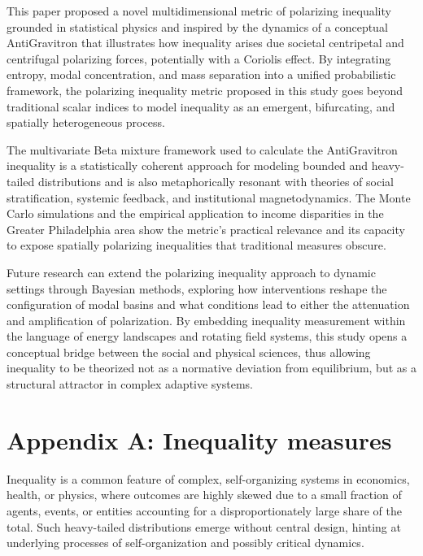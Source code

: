 \documentclass[11pt]{article}
\begin{document}
This paper proposed a novel multidimensional metric of polarizing inequality grounded in statistical physics and inspired by the dynamics of a conceptual AntiGravitron that illustrates how inequality arises due societal centripetal and centrifugal polarizing forces, potentially with a Coriolis effect. By integrating entropy, modal concentration, and mass separation into a unified probabilistic framework, the polarizing inequality metric proposed in this study goes beyond traditional scalar indices to model inequality as an emergent, bifurcating, and spatially heterogeneous process.

The multivariate Beta mixture framework used to calculate the AntiGravitron inequality is a statistically coherent approach for modeling bounded and heavy-tailed distributions and is also metaphorically resonant with theories of social stratification, systemic feedback, and institutional magnetodynamics. The Monte Carlo simulations and the empirical application to income disparities in the Greater Philadelphia area show the metric’s practical relevance and its capacity to expose spatially polarizing inequalities that traditional measures obscure.

Future research can extend the polarizing inequality approach to dynamic settings through Bayesian methods, exploring how interventions reshape the configuration of modal basins and what conditions lead to either the attenuation and amplification of polarization. By embedding inequality measurement within the language of energy landscapes and rotating field systems, this study opens a conceptual bridge between the social and physical sciences, thus allowing inequality to be theorized not as a normative deviation from equilibrium, but as a structural attractor in complex adaptive systems.

\printbibliography

\section*{Appendix A: Inequality measures}

Inequality is a common feature of complex, self-organizing systems in economics, health, or physics, where outcomes are highly skewed due to a small fraction of agents, events, or entities accounting for a disproportionately large share of the total. Such heavy-tailed distributions emerge without central design, hinting at underlying processes of self-organization and possibly critical dynamics.  
\end{document}
